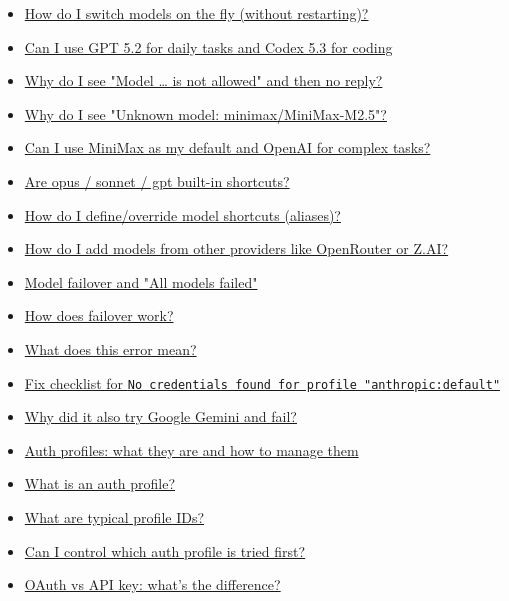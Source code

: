 \begin{itemize}
  \item \href{\#how-do-i-switch-models-on-the-fly-without-restarting}{How do I switch models on the fly (without restarting)?}
  \item \href{\#can-i-use-gpt-52-for-daily-tasks-and-codex-53-for-coding}{Can I use GPT 5.2 for daily tasks and Codex 5.3 for coding}
  \item \href{\#why-do-i-see-model-is-not-allowed-and-then-no-reply}{Why do I see "Model … is not allowed" and then no reply?}
  \item \href{\#why-do-i-see-unknown-model-minimaxminimaxm25}{Why do I see "Unknown model: minimax/MiniMax-M2.5"?}
  \item \href{\#can-i-use-minimax-as-my-default-and-openai-for-complex-tasks}{Can I use MiniMax as my default and OpenAI for complex tasks?}
  \item \href{\#are-opus-sonnet-gpt-builtin-shortcuts}{Are opus / sonnet / gpt built-in shortcuts?}
  \item \href{\#how-do-i-defineoverride-model-shortcuts-aliases}{How do I define/override model shortcuts (aliases)?}
  \item \href{\#how-do-i-add-models-from-other-providers-like-openrouter-or-zai}{How do I add models from other providers like OpenRouter or Z.AI?}
  \item \href{\#model-failover-and-all-models-failed}{Model failover and "All models failed"}
  \item \href{\#how-does-failover-work}{How does failover work?}
  \item \href{\#what-does-this-error-mean}{What does this error mean?}
  \item \href{\#fix-checklist-for-no-credentials-found-for-profile-anthropicdefault}{Fix checklist for \texttt{No credentials found for profile "anthropic:default"}}
  \item \href{\#why-did-it-also-try-google-gemini-and-fail}{Why did it also try Google Gemini and fail?}
  \item \href{\#auth-profiles-what-they-are-and-how-to-manage-them}{Auth profiles: what they are and how to manage them}
  \item \href{\#what-is-an-auth-profile}{What is an auth profile?}
  \item \href{\#what-are-typical-profile-ids}{What are typical profile IDs?}
  \item \href{\#can-i-control-which-auth-profile-is-tried-first}{Can I control which auth profile is tried first?}
  \item \href{\#oauth-vs-api-key-whats-the-difference}{OAuth vs API key: what's the difference?}

\end{itemize}
